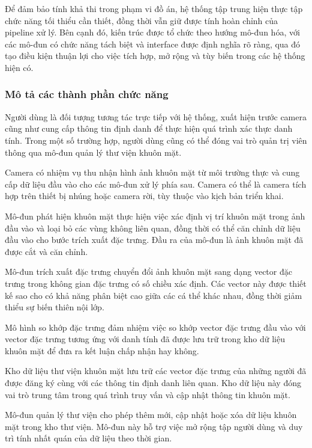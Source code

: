Để đảm bảo tính khả thi trong phạm vi đồ án, hệ thống tập trung hiện thực tập chức năng tối thiểu cần thiết, đồng thời vẫn giữ được tính hoàn chỉnh của pipeline xử lý. Bên cạnh đó, kiến trúc được tổ chức theo hướng mô-đun hóa, với các mô-đun có chức năng tách biệt và interface được định nghĩa rõ ràng, qua đó tạo điều kiện thuận lợi cho việc tích hợp, mở rộng và tùy biến trong các hệ thống hiện có.
\subsubsection{ Mô tả các thành phần chức năng}

Người dùng là đối tượng tương tác trực tiếp với hệ thống, xuất hiện trước camera cũng như cung cấp thông tin định danh để thực hiện quá trình xác thực danh tính. Trong một số trường hợp, người dùng cũng có thể đóng vai trò quản trị viên thông qua mô-đun quản lý thư viện khuôn mặt.

Camera có nhiệm vụ thu nhận hình ảnh khuôn mặt từ môi trường thực và cung cấp dữ liệu đầu vào cho các mô-đun xử lý phía sau. Camera có thể là camera tích hợp trên thiết bị nhúng hoặc camera rời, tùy thuộc vào kịch bản triển khai.

Mô-đun phát hiện khuôn mặt thực hiện việc xác định vị trí khuôn mặt trong ảnh đầu vào và loại bỏ các vùng không liên quan, đồng thời có thể căn chỉnh dữ liệu đầu vào cho bước trích xuất đặc trưng. Đầu ra của mô-đun là ảnh khuôn mặt đã được cắt và căn chỉnh.

Mô-đun trích xuất đặc trưng chuyển đổi ảnh khuôn mặt sang dạng vector đặc trưng trong không gian đặc trưng có số chiều xác định. Các vector này được thiết kế sao cho có khả năng phân biệt cao giữa các cá thể khác nhau, đồng thời giảm thiểu sự biến thiên nội lớp.

Mô hình so khớp đặc trưng đảm nhiệm việc so khớp vector đặc trưng đầu vào với vector đặc trưng tương ứng với danh tính đã được lưu trữ trong kho dữ liệu khuôn mặt để đưa ra kết luận chấp nhận hay không.

Kho dữ liệu thư viện khuôn mặt lưu trữ các vector đặc trưng của những người đã được đăng ký cùng với các thông tin định danh liên quan. Kho dữ liệu này đóng vai trò trung tâm trong quá trình truy vấn và cập nhật thông tin khuôn mặt.

Mô-đun quản lý thư viện cho phép thêm mới, cập nhật hoặc xóa dữ liệu khuôn mặt trong kho thư viện. Mô-đun này hỗ trợ việc mở rộng tập người dùng và duy trì tính nhất quán của dữ liệu theo thời gian.
